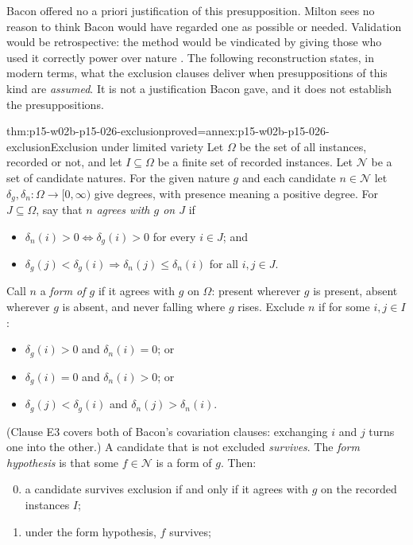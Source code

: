 Bacon offered no a priori justification of this presupposition. Milton
sees no reason to think Bacon would have regarded one as possible or
needed. Validation would be retrospective: the method would be vindicated
by giving those who used it correctly power over nature
\cite[p.~27]{Milton2011InductionBeforeHume}. The following reconstruction
states, in modern terms, what the exclusion clauses deliver when
presuppositions of this kind are \emph{assumed}. It is not a justification
Bacon gave, and it does not establish the presuppositions.

\begin{hblemma}{thm:p15-w02b-p15-026-exclusion}{proved=annex:p15-w02b-p15-026-exclusion}{Exclusion under limited variety}
Let $\Omega$ be the set of all instances, recorded or not, and let
$I\subseteq\Omega$ be a finite set of recorded instances. Let
$\mathcal N$ be a set of candidate natures. For the given nature $g$ and
each candidate $n\in\mathcal N$ let $\delta_g,\delta_n\colon\Omega\to[0,\infty)$
give degrees, with presence meaning a positive degree. For $J\subseteq\Omega$,
say that $n$ \emph{agrees with $g$ on $J$} if
\begin{itemize}
\item[(A1)] $\delta_n(i)>0\iff\delta_g(i)>0$ for every $i\in J$; and
\item[(A2)] $\delta_g(j)<\delta_g(i)\Rightarrow\delta_n(j)\leq\delta_n(i)$
  for all $i,j\in J$.
\end{itemize}
Call $n$ a \emph{form of $g$} if it agrees with $g$ on $\Omega$: present
wherever $g$ is present, absent wherever $g$ is absent, and never falling
where $g$ rises. Exclude $n$ if for some $i,j\in I$:
\begin{itemize}
\item[(E1)] $\delta_g(i)>0$ and $\delta_n(i)=0$; or
\item[(E2)] $\delta_g(i)=0$ and $\delta_n(i)>0$; or
\item[(E3)] $\delta_g(j)<\delta_g(i)$ and $\delta_n(j)>\delta_n(i)$.
\end{itemize}
(Clause E3 covers both of Bacon's covariation clauses: exchanging $i$ and
$j$ turns one into the other.) A candidate that is not excluded
\emph{survives}. The \emph{form hypothesis} is that some $f\in\mathcal N$
is a form of $g$. Then:
\begin{enumerate}
\setcounter{enumi}{-1}
\item a candidate survives exclusion if and only if it agrees with $g$ on
  the recorded instances $I$;
\item under the form hypothesis, $f$ survives;

\end{enumerate}
\end{hblemma}
